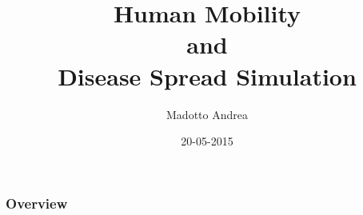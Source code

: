 \documentclass{beamer}
\title[Short title]{Human Mobility \\ and \\ Disease Spread Simulation} %
\author{Madotto Andrea} %
\institute[UCLA] %
{
Hong Kong Baptist University \\ %
\medskip
\textit{M.Sc. Practicum} %
}
\date{20-05-2015} %
\begin{document}
\begin{frame}
\titlepage %
\end{frame}

\begin{frame}
\frametitle{Overview} %
\tableofcontents %
\end{frame}







\end{document}
